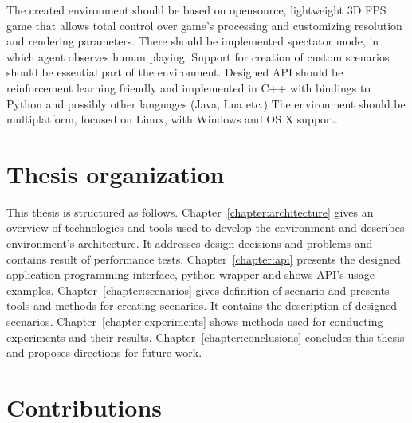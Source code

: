 The created environment should be based on opensource, lightweight 3D FPS game that allows total control over game's processing and customizing resolution and rendering parameters.
There should be implemented spectator mode, in which agent observes human playing.
Support for creation of custom scenarios should be essential part of the environment. 
Designed API should be reinforcement learning friendly and implemented in C++ with bindings to Python and possibly other languages (Java, Lua etc.)
The environment should be multiplatform, focused on Linux, with Windows and OS X support.
	
\section{Thesis organization}


This thesis is structured as follows. 
Chapter~\ref{chapter:architecture} gives an overview of technologies and tools used to develop the environment and describes environment's architecture. It addresses design decisions and problems and contains result of performance tests. 
Chapter~\ref{chapter:api} presents the designed application programming interface, python wrapper and shows API's usage examples. 
Chapter~\ref{chapter:scenarios} gives definition of scenario and presents tools and methods for creating scenarios. It contains the description of designed scenarios. 
Chapter~\ref{chapter:experiments} shows methods used for conducting experiments and their results. 
Chapter~\ref{chapter:conclusions} concludes this thesis and proposes directions for future work.

\section{Contributions}
